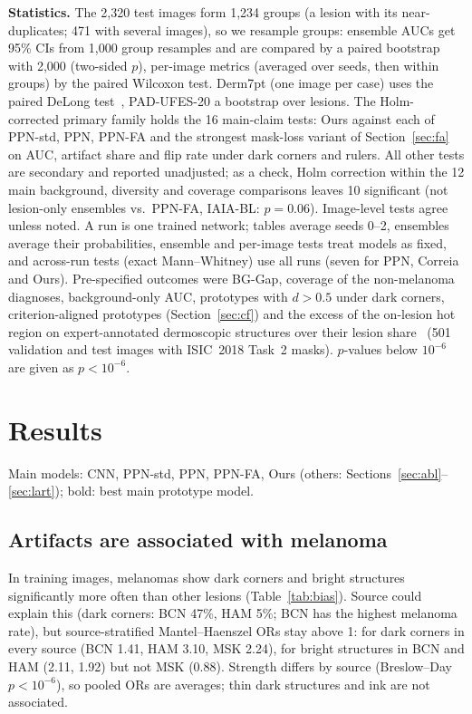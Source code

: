 \documentclass[conference]{IEEEtran}
\begin{document}
\textbf{Statistics.} The 2{,}320 test images form 1{,}234 groups (a lesion with its near-duplicates; 471 with several images), so we resample groups: ensemble AUCs get 95\% CIs from 1{,}000 group resamples and are compared by a paired bootstrap with 2{,}000 (two-sided $p$), per-image metrics (averaged over seeds, then within groups) by the paired Wilcoxon test. Derm7pt (one image per case) uses the paired DeLong test~\cite{delong1988,sun2014}, PAD-UFES-20 a bootstrap over lesions. The Holm-corrected primary family holds the 16 main-claim tests: Ours against each of PPN-std, PPN, PPN-FA and the strongest mask-loss variant of Section~\ref{sec:fa} on AUC, artifact share and flip rate under dark corners and rulers. All other tests are secondary and reported unadjusted; as a check, Holm correction within the 12 main background, diversity and coverage comparisons leaves 10 significant (not lesion-only ensembles vs.\ PPN-FA, IAIA-BL: $p=0.06$). Image-level tests agree unless noted. A run is one trained network; tables average seeds 0--2, ensembles average their probabilities, ensemble and per-image tests treat models as fixed, and across-run tests (exact Mann--Whitney) use all runs (seven for PPN, Correia and Ours). Pre-specified outcomes were BG-Gap, coverage of the non-melanoma diagnoses, background-only AUC, prototypes with $d>0.5$ under dark corners, criterion-aligned prototypes (Section~\ref{sec:cf}) and the excess of the on-lesion hot region on expert-annotated dermoscopic structures over their lesion share~\cite{codella2019} (501 validation and test images with ISIC~2018 Task~2 masks). $p$-values below $10^{-6}$ are given as $p<10^{-6}$.

\section{Results}
Main models: CNN, PPN-std, PPN, PPN-FA, Ours (others: Sections~\ref{sec:abl}--\ref{sec:lart}); bold: best main prototype model.

\subsection{Artifacts are associated with melanoma}
In training images, melanomas show dark corners and bright structures significantly more often than other lesions (Table~\ref{tab:bias}). Source could explain this (dark corners: BCN 47\%, HAM 5\%; BCN has the highest melanoma rate), but source-stratified Mantel--Haenszel ORs stay above 1: for dark corners in every source (BCN 1.41, HAM 3.10, MSK 2.24), for bright structures in BCN and HAM (2.11, 1.92) but not MSK (0.88). Strength differs by source (Breslow--Day $p<10^{-6}$), so pooled ORs are averages; thin dark structures and ink are not associated.
\end{document}
